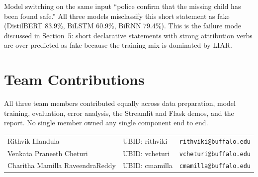 \documentclass{article}
\begin{document}
Model switching on the same input ``police confirm that the missing child has been found safe.'' All three models misclassify this short statement as fake (DistilBERT 83.9\%, BiLSTM 60.9\%, BiRNN 79.4\%). This is the failure mode discussed in Section~5: short declarative statements with strong attribution verbs are over-predicted as fake because the training mix is dominated by LIAR.

\section{Team Contributions}

All three team members contributed equally across data preparation, model training, evaluation, error analysis, the Streamlit and Flask demos, and the report. No single member owned any single component end to end.

\begin{tabular}{lll}
Rithvik Illandula              & UBID: rithviki  & \texttt{rithviki@buffalo.edu} \\
Venkata Praneeth Cheturi       & UBID: vcheturi  & \texttt{vcheturi@buffalo.edu} \\
Charitha Mamilla RaveendraReddy & UBID: cmamilla  & \texttt{cmamilla@buffalo.edu} \\
\end{tabular}


\newpage

\end{document}
